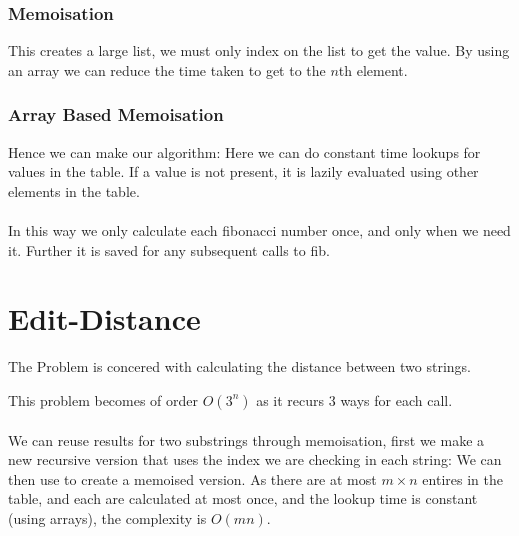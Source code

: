 \documentclass{report}
\begin{document}
\subsubsection*{Memoisation}
This creates a large list, we must only index on the list to get the value.
By using an array we can reduce the time taken to get to the $n$th element.
\subsubsection*{Array Based Memoisation}
Hence we can make our algorithm:
Here we can do constant time lookups for values in the table. If a value is not present, it is lazily evaluated using other elements in the table.
\\
\\ In this way we only calculate each fibonacci number once, and only when we need it. Further it is saved for any subsequent calls to fib.

\section*{Edit-Distance}
The  Problem is concered with calculating the  distance between two strings.

This problem becomes of order $O(3^n)$ as it recurs 3 ways for each call.
\\
\\ We can reuse results for two substrings through memoisation, first we make a new recursive version that uses the index we are checking in each string:
We can then use  to create a memoised version.
As there are at most $m \times n$ entires in the table, and each are calculated at most once, and the lookup time is constant (using arrays), the complexity is $O(mn)$.
\end{document}
